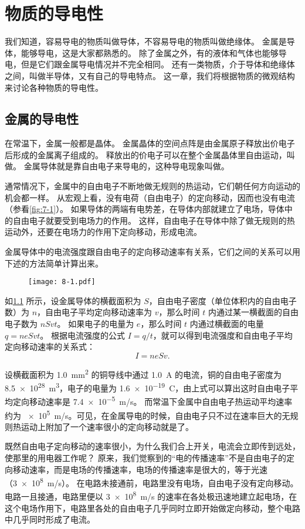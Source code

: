 \chapter{物质的导电性}\label{chp:conductivity}
我们知道，容易导电的物质叫做导体，不容易导电的物质叫做绝缘体。
金属是导体，能够导电，这是大家都熟悉的。
除了金属之外，有的液体和气体也能够导电，但是它们跟金属导电情况并不完全相同。
还有一类物质，介于导体和绝缘体之间，叫做半导体，又有自己的导电特点。
这一章，我们将根据物质的微观结构来讨论各种物质的导电性。

\section{金属的导电性}
在常温下，金属一般都是晶体。
金属晶体的空间点阵是由金属原子释放出价电子后形成的金属离子组成的。
释放出的价电子可以在整个金属晶体里自由运动，叫做。
金属导体就是靠自由电子来导电的，这种导电现象叫做。

通常情况下，金属中的自由电子不断地做无规则的热运动，它们朝任何方向运动的机会都一样。
从宏观上看，没有电荷（自由电子）的定向移动，因而也没有电流（参看\cref{fig:7-1}）。
如果导体的两端有电势差，在导体内部就建立了电场，导体中的自由电子就要受到电场力的作用。
这样，自由电子在导体中除了做无规则的热运动外，还要在电场力的作用下定向移动，形成电流。

金属导体中的电流强度跟自由电子的定向移动速率有关系，它们之间的关系可以用下述的方法简单计算出来。
\begin{figure}
  \texttt{[image: 8-1.pdf]}	
  \caption{}\label{fig:8-1}
\end{figure}

如\cref{fig:8-1} 所示，设金属导体的横截面积为 $S$，自由电子密度（单位体积内的自由电子数）为 $n$，自由电子平均定向移动速率为 $v$，那么时间 $t$ 内通过某一横截面的自由电子数为 $nSvt$。
如果电子的电量为 $e$，那么时间 $t$ 内通过横截面的电量 $q=neSvt$。
根据电流强度的公式 $I=q/t$，就可以得到电流强度和自由电子平均定向移动速率的关系式：
\[I=neSv.\]

设横截面积为 \qty{1.0}{mm^2} 的铜导线中通过 \qty{1.0}{A} 的电流，铜的自由电子密度为 \qty{8.5e28}{m^3}，电子的电量为 \qty{1.6e-19}{C}，由上式可以算出这时自由电子平均定向移动速率是 \qty{7.4e-5}{m/s}。
而常温下金属中自由电子热运动平均速率约为 \qty{e5}{m/s}。可见，在金属导电的时候，自由电子只不过在速率巨大的无规则热运动上附加了一个速率很小的定向移动就是了。

既然自由电子定向移动的速率很小，为什么我们合上开关，电流会立即传到远处，使那里的用电器工作呢？
原来，我们觉察到的“电的传播速率”不是自由电子的定向移动速率，而是电场的传播速率，电场的传播速率是很大的，等于光速（\qty{3e8}{m/s}）。
在电路未接通前，电路里没有电场，自由电子没有定向移动。
电路一且接通，电路里便以 \qty{3e8}{m/s} 的速率在各处极迅速地建立起电场，在这个电场作用下，电路里各处的自由电子几乎同时立即开始做定向移动，整个电路中几乎同时形成了电流。

